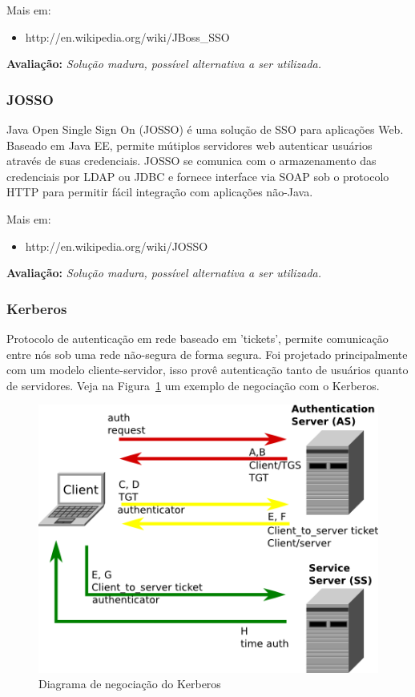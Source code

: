 \documentclass[11pt]{article}
\begin{document}
Mais em:
\begin{itemize}
  \item{http://en.wikipedia.org/wiki/JBoss\_SSO}
\end{itemize}

{\bf Avaliação:} {\it Solução madura, possível alternativa a ser utilizada.}

\subsubsection{JOSSO}

Java Open Single Sign On (JOSSO) é uma solução de SSO para aplicações Web.
Baseado em Java EE, permite mútiplos servidores web autenticar
usuários através de suas credenciais. JOSSO se comunica com o armazenamento das
credenciais por LDAP ou JDBC e fornece interface via SOAP sob o protocolo HTTP
para permitir fácil integração com aplicações não-Java.

Mais em:
\begin{itemize}
  \item{http://en.wikipedia.org/wiki/JOSSO}
\end{itemize}

{\bf Avaliação:} {\it Solução madura, possível alternativa a ser utilizada.}

\subsubsection{Kerberos}

Protocolo de autenticação em rede baseado em 'tickets', permite comunicação
entre nós sob uma rede não-segura de forma segura. Foi projetado
principalmente com um modelo cliente-servidor, isso provê autenticação tanto
de usuários quanto de servidores. Veja na Figura~\ref{fig:kerberos} um exemplo
de negociação com o Kerberos.

\begin{figure}[h]
\center
\includegraphics[scale=0.6]{kerberos.png}
\caption{Diagrama de negociação do Kerberos}
\label{fig:kerberos}
\end{figure}
\end{document}
